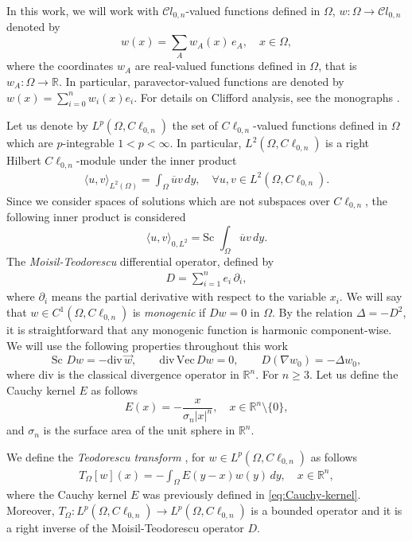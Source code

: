 \documentclass[12pt]{article}
\def\div{\mbox{div}\,}
\def\R{\mathbb{R}}
\def\Vec{\mbox{Vec}\,}
\begin{document}
 In this work, we will work with $\mathcal{C}l_{0,n}$-valued functions defined in $\Omega$, $w \colon \Omega \to \mathcal{C}l_{0,n}$ denoted by
\[ 
w(x)=\sum_A w_A(x)\, e_A, \quad x\in \Omega,
\]
where the coordinates $w_A$ are real-valued functions defined in $\Omega$, that is $w_A\colon \Omega \to \R$. 
In particular, paravector-valued functions are denoted by $w(x)=\sum_{i=0}^n w_i(x) e_i$. For details on Clifford analysis, see the monographs \cite{BDS1982, GuSpr1997, GuHaSpr2008}.


Let us denote by $L^p(\Omega,C\ell_{0,n})$ the set of $C\ell_{0,n}$-valued functions defined in $\Omega$ which are $p$-integrable $1<p<\infty$. In particular, $L^2(\Omega,C\ell_{0,n})$ is a right Hilbert $C\ell_{0,n}$-module under the inner product
\begin{align}\label{eq:inner-product}
  \langle u,v\rangle_{L^2(\Omega)}=\int_{\Omega}\overline{u} v \, dy, \quad \forall u,v\in L^2(\Omega,C\ell_{0,n}).
\end{align}
Since we consider spaces of solutions which are not subspaces over $C\ell_{0,n}$, the following inner product is considered
\begin{equation}\label{eq:scalar-product}
   \langle u,v\rangle_{0,L^2}=\text{Sc }\int_{\Omega} \overline{u}v\, dy. 
\end{equation}
The \textit{Moisil-Teodorescu} differential operator, defined by 
\begin{align}\label{eq:Moisil-Teodorescu}
  D=\sum_{i=1}^n e_i \, \partial_i,
\end{align}
where $\partial_i$ means the partial derivative with respect to the variable $x_i$. We will say that $w\in C^1(\Omega,C\ell_{0,n})$ is \textit{monogenic} if $D w=0$ in $\Omega$. By the relation $\Delta=-D^2$, it is straightforward that any monogenic function is harmonic component-wise. 
We will use the following properties throughout this work
\[
\text{Sc }Dw=-\div \vec w, \qquad \div \Vec Dw=0, \qquad D(\nabla w_0)=-\Delta w_0,
\]
where $\text{div}$ is the classical divergence operator in $\mathbb{R}^n$.
For $n\geq 3$. Let us define the Cauchy kernel $E$ as follows
\begin{equation}\label{eq:Cauchy-kernel}
E(x)=-\frac{x}{\sigma_n|x|^n}, \quad x\in \R^n\setminus\{0\},
\end{equation}
and $\sigma_n$ is the surface area of the unit sphere in $\R^n$.

We define the \textit{Teodorescu transform} \cite{GuHaSpr2008}, for $w\in L^p(\Omega,C\ell_{0,n})$ as follows
\begin{align}\label{eq:Teodorescu_operator}
   T_{\Omega}[w](x)=-\int_{\Omega} 
	  E(y-x) w(y)\, dy, \quad x\in\R^n,
\end{align}
where the Cauchy kernel $E$ was previously defined in \eqref{eq:Cauchy-kernel}. Moreover, $T_{\Omega}\colon L^p(\Omega, C\ell_{0,n})\to L^p(\Omega, C\ell_{0,n})$ is a bounded operator and it is a right inverse of the Moisil-Teodorescu operator $D$. %
\end{document}
